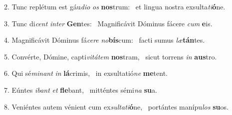2. Tunc replétum est gáu\textit{di}\textit{o} \textit{os} \textbf{nos}trum: \ast\  et lingua nostra exsulta\textit{ti}\textbf{ó}ne.\

3. Tunc di\textit{cent} \textit{in}\textit{ter} \textbf{Gen}tes: \ast\  Magnificávit Dóminus fácere \textit{cum} \textbf{e}is.\

4. Magnificávit Dóminus fá\textit{ce}\textit{re} \textit{no}\textbf{bís}cum: \ast\  facti sumus \textit{læ}\textbf{tán}tes.\

5. Convérte, Dómine, capti\textit{vi}\textit{tá}\textit{tem} \textbf{nos}tram, \ast\  sicut torrens \textit{in} \textbf{aus}tro.\

6. Qui sé\textit{mi}\textit{nant} \textit{in} \textbf{lá}crimis, \ast\  in exsultatió\textit{ne} \textbf{me}tent.\

7. Eúntes \textit{i}\textit{bant} \textit{et} \textbf{fle}bant, \ast\  mitténtes sémi\textit{na} \textbf{su}a.\

8. Veniéntes autem vénient cum ex\textit{sul}\textit{ta}\textit{ti}\textbf{ó}ne, \ast\  portántes manípu\textit{los} \textbf{su}os.\

